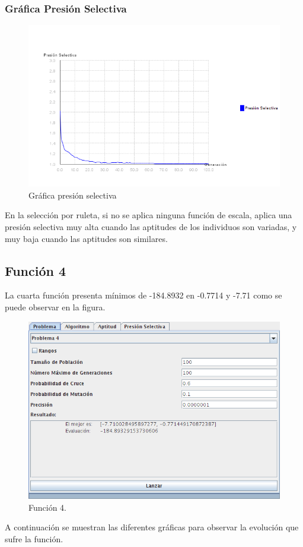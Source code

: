 \documentclass[12pt]{article}
\begin{document}
\subsubsection*{Gráfica Presión Selectiva}
\begin{figure}[H]
\centering
\includegraphics[scale=0.4]{graficas/F3inicial_presion}
\caption{Gráfica presión selectiva}
\label{fig}
\end{figure}
	En la selección por ruleta, si no se aplica ninguna función de escala, aplica una presión selectiva muy alta cuando las aptitudes de los individuos son variadas, y muy baja cuando las aptitudes son similares.
\newpage

\subsection{Función 4}
	La cuarta función presenta mínimos de -184.8932 en -0.7714 y -7.71 como se puede observar en la figura.
\begin{figure}[H]
\centering
\includegraphics[scale=0.4]{graficas/F4inicial}
\caption{Función 4.}
\label{fig}
\end{figure}
	A continuación se muestran las diferentes gráficas para observar la evolución que sufre la función.
\end{document}
